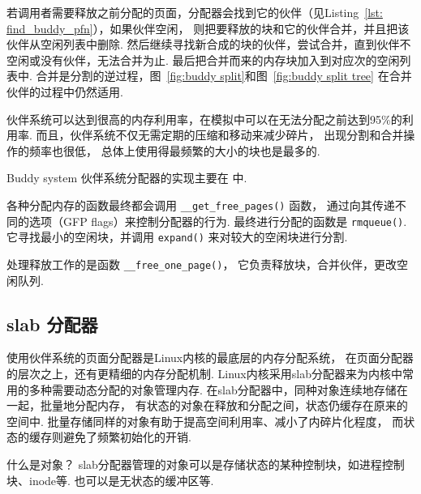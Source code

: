 若调用者需要释放之前分配的页面，分配器会找到它的伙伴（见Listing~\ref{lst: find_buddy_pfn}），如果伙伴空闲，
则把要释放的块和它的伙伴合并，并且把该伙伴从空闲列表中删除.
然后继续寻找新合成的块的伙伴，尝试合并，直到伙伴不空闲或没有伙伴，无法合并为止.
最后把合并而来的内存块加入到对应次的空闲列表中.
合并是分割的逆过程，图~\ref{fig:buddy split}和图~\ref{fig:buddy split tree}
在合并伙伴的过程中仍然适用.

伙伴系统可以达到很高的内存利用率，在模拟中可以在无法分配之前达到95\%的利用率.
而且，伙伴系统不仅无需定期的压缩和移动来减少碎片，
出现分割和合并操作的频率也很低，
总体上使用得最频繁的大小的块也是最多的.\cite{taocp1}

\begin{readsrcbox}{Buddy system}
	伙伴系统分配器的实现主要在  中.

	各种分配内存的函数最终都会调用 \lstinline{__get_free_pages()} 函数，
	通过向其传递不同的选项（GFP flags）来控制分配器的行为.
	最终进行分配的函数是 \lstinline{rmqueue()}.
	它寻找最小的空闲块，并调用 \lstinline{expand()} 来对较大的空闲块进行分割.

	处理释放工作的是函数 \lstinline{__free_one_page()}，
	它负责释放块，合并伙伴，更改空闲队列.
\end{readsrcbox}

\subsection{slab 分配器}
使用伙伴系统的页面分配器是Linux内核的最底层的内存分配系统，
在页面分配器的层次之上，还有更精细的内存分配机制.
Linux内核采用slab分配器来为内核中常用的多种需要动态分配的对象管理内存.
在slab分配器中，同种对象连续地存储在一起，批量地分配内存，
有状态的对象在释放和分配之间，状态仍缓存在原来的空间中.
批量存储同样的对象有助于提高空间利用率、减小了内碎片化程度，
而状态的缓存则避免了频繁初始化的开销.
\cite{bonwick1994slab}
\begin{qbox}{什么是对象？}
	slab分配器管理的对象可以是存储状态的某种控制块，如进程控制块、inode等.
	也可以是无状态的缓冲区等.
\end{qbox}

